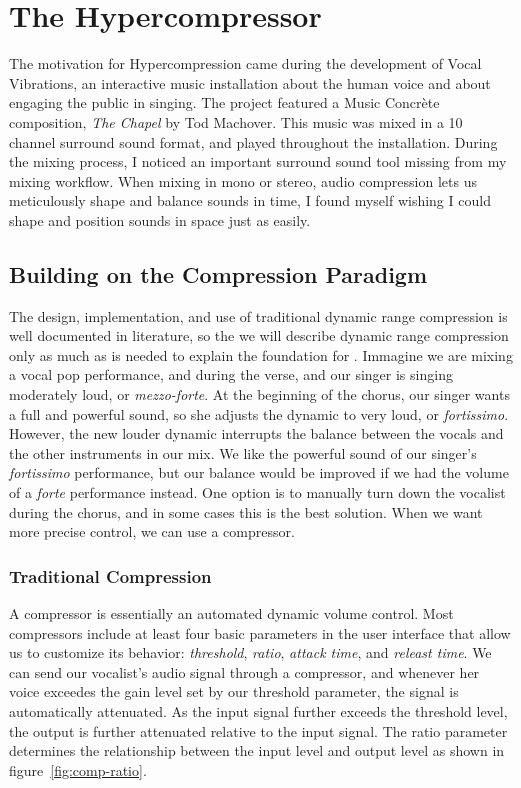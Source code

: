 \chapter{The Hypercompressor}
\label{ch:hypercompressor}

The motivation for Hypercompression came during the development of
Vocal Vibrations, an interactive music installation about the human
voice and about engaging the public in singing.\cite{Holbrow2014} The
project featured a Music Concr\`{e}te composition, \textit{The Chapel}
by Tod Machover. This music was mixed in a 10 channel surround sound
format, and played throughout the installation. During the mixing
process, I noticed an important surround sound tool missing from my
mixing workflow. When mixing in mono or stereo, audio
compression lets us meticulously shape and balance sounds in
time, I found myself wishing I could shape and position sounds in
space just as easily.

\section{Building on the Compression Paradigm}
The design, implementation, and use of traditional dynamic range
compression is well documented in
literature,\cite[]{Giannoulis2012,Case2007,Deruty2014} so the we will
describe dynamic range compression only as much as is needed to
explain the foundation for \thesis. Immagine we are mixing a vocal pop
performance, and during the verse, and our singer is singing
moderately loud, or \textit{mezzo-forte}. At the beginning of the
chorus, our singer wants a full and powerful sound, so she adjusts the
dynamic to very loud, or \textit{fortissimo}. However, the new louder
dynamic interrupts the balance between the vocals and the other
instruments in our mix. We like the powerful sound of our singer's
\textit{fortissimo} performance, but our balance would be improved if
we had the volume of a \textit{forte} performance instead. One option
is to manually turn down the vocalist during the chorus, and in some
cases this is the best solution. When we want more precise control, we
can use a compressor.

\subsection{Traditional Compression}
\label{sec:trad-compr}
A compressor is essentially an automated dynamic volume control.  Most
compressors include at least four basic parameters in the user
interface that allow us to customize its behavior: \textit{threshold},
\textit{ratio}, \textit{attack time}, and \textit{releast time}.  We
can send our vocalist's audio signal through a compressor, and
whenever her voice exceedes the gain level set by our threshold
parameter, the signal is automatically attenuated. As the input signal
further exceeds the threshold level, the output is further attenuated
relative to the input signal. The ratio parameter determines the
relationship between the input level and output level as shown in
figure~\ref{fig:comp-ratio}.

